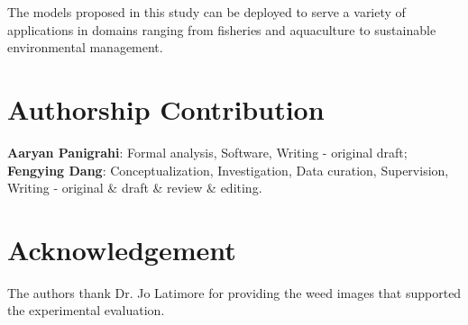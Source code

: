 \documentclass[final,3p,times,twocolumn]{elsarticle}
\begin{document}
The models proposed in this study can be deployed to serve a variety of applications in domains ranging from fisheries and aquaculture to sustainable environmental management.



\section*{Authorship Contribution}

\textbf{Aaryan Panigrahi}: Formal analysis, Software, Writing - original draft; \\
\textbf{Fengying Dang}: Conceptualization, Investigation, Data curation, Supervision, Writing - original \& draft \& review \& editing.  

\section*{Acknowledgement}
The authors thank Dr. Jo Latimore for providing the weed images that supported the experimental evaluation.


\typeout{}
% 

\end{document}
